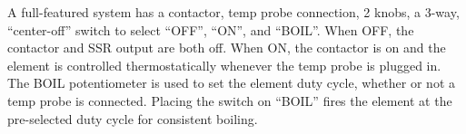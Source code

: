 \documentclass[dvips,12pt]{article}
\begin{document}
A
full-featured system has a contactor, temp probe connection, 2 knobs, a 3-way, ``center-off'' switch to select ``OFF'',
``ON'', and ``BOIL''. When OFF, the contactor and SSR output are both off.
When ON, the contactor is on and the element is controlled thermostatically
whenever the temp probe is plugged in. 
The BOIL potentiometer is used to set the element 
duty cycle, whether or not a temp probe is connected. Placing the switch on
``BOIL'' fires the element at the pre-selected duty cycle for consistent
boiling.

\centering
\vspace{2cm}
\appendix
\end{document}
